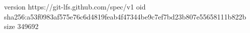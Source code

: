 version https://git-lfs.github.com/spec/v1
oid sha256:a53f0983af575e76c6d4819feab4f47344be9c7ef7bd23b807e55658111b822b
size 349692
